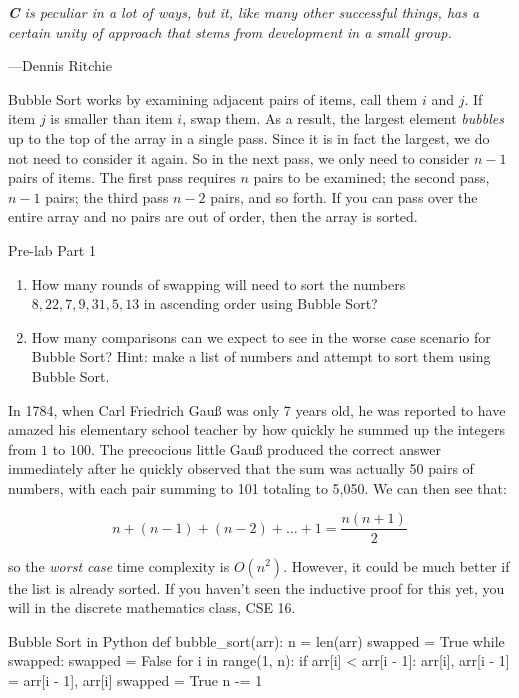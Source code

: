 \documentclass[11pt]{article}
\begin{document}
\epigraph{\emph{\textbf{C} is peculiar in a lot of ways, but it, like
many other successful things, has a certain unity of approach that stems
from development in a small group.}}{---Dennis Ritchie}

\noindent Bubble Sort works by examining adjacent pairs of items, call
them $i$ and $j$. If item $j$ is smaller than item $i$, swap them. As a
result, the largest element \emph{bubbles} up to the top of the array in
a single pass. Since it is in fact the largest, we do not need to
consider it again. So in the next pass, we only need to consider $n-1$
pairs of items. The first pass requires $n$ pairs to be examined; the
second pass, $n-1$ pairs; the third pass $n-2$ pairs, and so forth. If
you can pass over the entire array and no pairs are out of order, then
the array is sorted.

\medskip
\begin{prelab}{Pre-lab Part 1}
  \begin{enumerate}
    \item How many rounds of swapping will need to sort the numbers ${8,
      22, 7, 9, 31, 5, 13}$ in ascending order using Bubble Sort?
    \item How many comparisons can we expect to see in the worse case
      scenario for Bubble Sort? Hint: make a list of numbers and attempt
      to sort them using Bubble Sort.
  \end{enumerate}
\end{prelab}

In 1784, when Carl Friedrich Gau{\ss} was only 7 years old, he was
reported to have amazed his elementary school teacher by how quickly he
summed up the integers from $1$ to $100$. The precocious little
Gau{\ss} produced the correct answer immediately after he quickly
observed that the sum was actually 50 pairs of numbers, with each pair
summing to 101 totaling to 5,050. We can then see that:

\[
  n+(n-1)+(n-2) + \ldots + 1 = \frac{n(n+1)}{2}
\]

\noindent so the \emph{worst case} time complexity is $O(n^2)$. However, it could
be much better if the list is already sorted. If you haven't seen the
inductive proof for this yet, you will in the discrete
mathematics class, CSE 16.

\begin{pythonlisting}{Bubble Sort in Python}
def bubble_sort(arr):
    n = len(arr)
    swapped = True
    while swapped:
        swapped = False
        for i in range(1, n):
            if arr[i] < arr[i - 1]:
                arr[i], arr[i - 1] = arr[i - 1], arr[i]
                swapped = True
        n -= 1
\end{pythonlisting}
\end{document}
